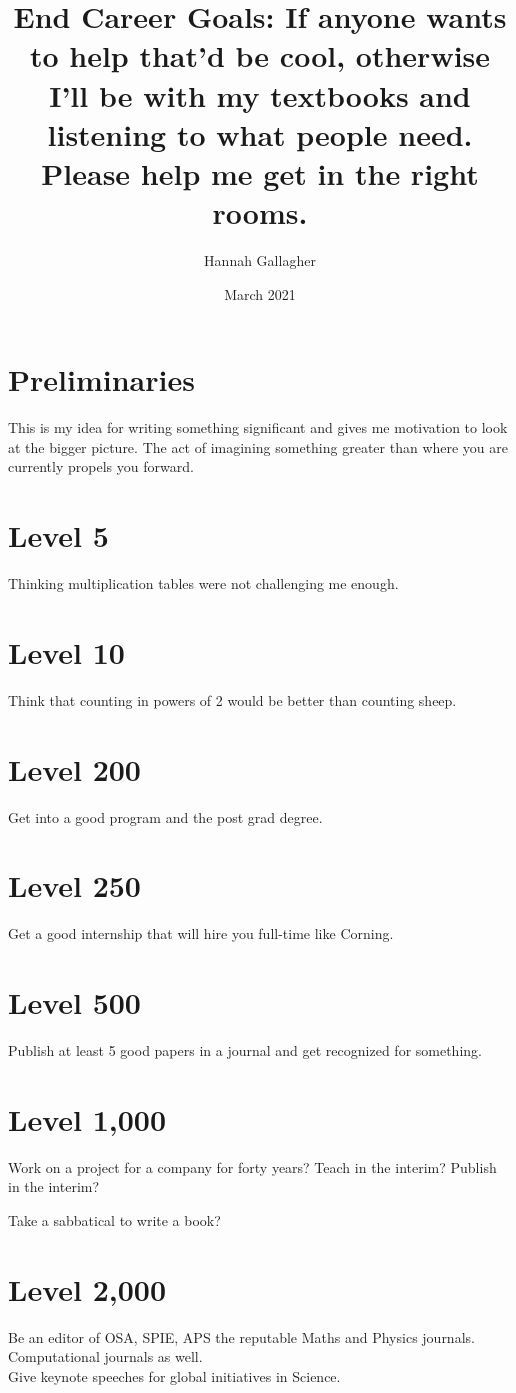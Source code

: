 \documentclass{article}
\title{End Career Goals: If anyone wants to help that'd be cool, otherwise I'll be with my textbooks and listening to what people need. Please help me get in the right rooms.}
\author{Hannah Gallagher}
\date{March 2021}
\begin{document}
\maketitle

\section*{Preliminaries}
This is my idea for writing something significant and gives me motivation to look at the bigger picture. The act of imagining something greater than where you are currently propels you forward.  


\section*{Level 5}
Thinking multiplication tables were not challenging me enough. 


\section*{Level 10}
Think that counting in powers of 2 would be better than counting sheep. 



\section*{Level 200}
Get into a good program and the post grad degree. 

\section*{Level 250}
Get a good internship that will hire you full-time like Corning. 


\section*{Level 500}
Publish at least 5 good papers in a journal and get recognized for something. 


\section*{Level 1,000}
Work on a project for a company for forty years? 
Teach in the interim? 
Publish in the interim? 

Take a sabbatical to write a book? 

\section*{Level 2,000}
Be an editor of OSA, SPIE, APS the reputable Maths and Physics journals. Computational journals as well. \\ 

Give keynote speeches for global initiatives in Science. 
\end{document}
